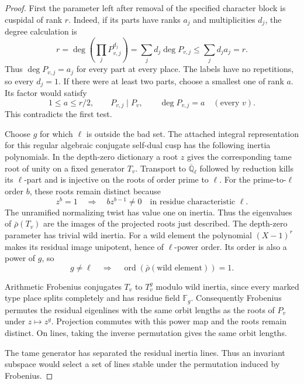 \begin{proof}
First the parameter left after removal of the specified character
block is cuspidal of rank \(r\). Indeed, if its parts have ranks
\(a_j\) and multiplicities \(d_j\), the degree calculation is
\[
 r=\deg\!\left(\prod_j P_{v,j}^{d_j}\right)=\sum_j d_j\deg P_{v,j}\le\sum_j d_j a_j=r.
\]
Thus \(\deg P_{v,j}=a_j\) for every part at every place.
The labels have no repetitions, so every \(d_j=1\). If there were at least two parts, choose a smallest one of rank \(a\). Its factor would satisfy
\[
 1\le a\le r/2,\qquad P_{v,j}\mid P_v,\qquad\deg P_{v,j}=a\quad(\text{every }v).
\]
This contradicts the
first test.

Choose \(g\) for which \(\ell\) is outside the bad set. The attached
integral representation for this regular algebraic conjugate
self-dual cusp has the following inertia polynomials. In the
depth-zero dictionary a root \(z\) gives the corresponding tame
root of unity on a fixed generator \(T_v\). Transport to
\(\overline{\mathbb Q}_\ell\) followed by reduction kills its
\(\ell\)-part and is injective on the roots of order prime to
\(\ell\). For the prime-to-\(\ell\) order \(b\), these roots remain distinct because
\[
 z^b=1\quad\Longrightarrow\quad b z^{b-1}\ne0
 \quad\text{in residue characteristic }\ell.
\] The unramified
normalizing twist has value one on inertia. Thus the eigenvalues of
\(\bar\rho(T_v)\) are the images of the projected roots just
described. The depth-zero parameter has trivial wild inertia.
For a wild element the polynomial \((X-1)^r\) makes its residual image unipotent, hence of \(\ell\)-power order. Its order is also a power of \(g\), so
\[
 g\ne\ell\quad\Longrightarrow\quad\operatorname{ord}(\bar\rho(\text{wild element}))=1.
\]

Arithmetic Frobenius conjugates \(T_v\) to \(T_v^g\) modulo wild
inertia, since every marked type place splits completely and has
residue field \(\mathbb F_g\). Consequently Frobenius permutes the
residual eigenlines with the same orbit lengths as the roots of
\(P_v\) under \(z\mapsto z^g\). Projection commutes with this
power map and the roots remain distinct. On lines, taking the
inverse permutation gives the same orbit lengths.

The tame generator has separated the residual inertia lines. Thus an invariant subspace would select a set of lines stable under the permutation induced by Frobenius.


\end{proof}
